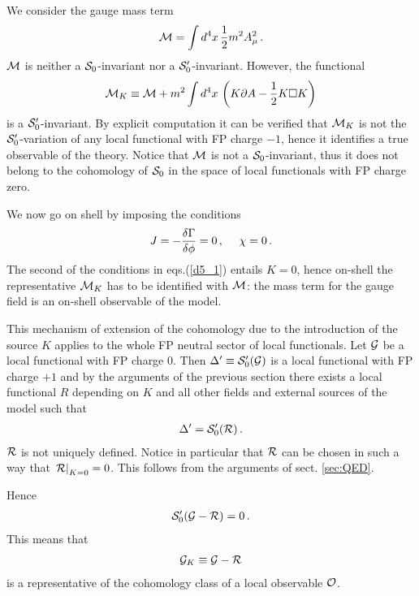 \documentclass[a4paper,11pt]{article}
\def\G{\Gamma}
\begin{document}
We consider the gauge mass term 
%
\begin{eqnarray}
{\cal M} = \int d^4x \,  {1 \over 2}m^2 A_\mu^2 \, .
\label{dd1}
\end{eqnarray}
%
${\cal M}$ is neither a ${\cal S}_0$-invariant nor 
a ${\cal S}'_0$-invariant. However, the functional
%
\begin{eqnarray}
{\cal M}_K \equiv {\cal M} + m^2 \int d^4x \, \left ( K \partial A - {1 \over 2} K \square K \right )
\label{dd2}
\end{eqnarray}
%
is a ${\cal S}'_0$-invariant. By explicit computation it can be
verified that ${\cal M}_K$ 
is not the ${\cal S}_0'$-variation of any local functional
with FP charge $-1$,
hence it identifies a true observable of the theory.
Notice that ${\cal M}$
 is not a ${\cal S}_0$-invariant, thus it does not belong to the 
cohomology of ${\cal S}_0$ in the space of local functionals with FP charge zero.

We now go on shell by imposing the conditions
%
\begin{eqnarray}
J = -{\delta \G \over \delta \phi} =0 \, , ~~~~ {\chi} = 0 \, .
\label{d5_1}
\end{eqnarray}
%
The second of the conditions in eqs.(\ref{d5_1}) entails $K=0$,
hence on-shell the representative ${\cal M}_K$ has to be identified
with ${\cal M}$: the mass term for the gauge field is an on-shell observable
of the model. 

This mechanism of extension of the cohomology due to the introduction of the source $K$ 
applies to the whole FP neutral sector of local functionals.
Let ${\cal G}$ be a local functional with FP charge $0$.
Then $\Delta' \equiv {\cal S}'_0({\cal G})$ is a local functional with FP 
charge $+1$
and by the arguments of the previous section there exists a local functional $R$ depending
on $K$ and all other fields and external sources of the model such that
%
\begin{eqnarray}
\Delta' = {\cal S}'_0({\cal R}) \, .
\label{agg1}
\end{eqnarray}
%
${\cal R}$ is not uniquely defined. Notice in particular that
${\cal R}$ can be chosen in such a way that $\left . {\cal R} \right |_{K=0}=0$.
This follows from the arguments of sect. \ref{sec:QED}.

Hence
%
\begin{eqnarray}
{\cal S}'_0({\cal G} -{\cal R}) = 0 \, .
\label{agg2}
\end{eqnarray}
%
This means that 
%
\begin{eqnarray}
{\cal G}_K \equiv {\cal G} - {\cal R}
\label{d4}
\end{eqnarray}
%
is a representative of the cohomology class of a local 
observable ${\cal O}$.
\end{document}
